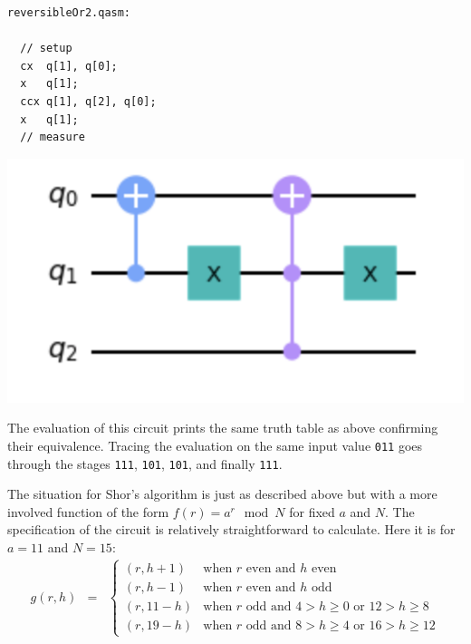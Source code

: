 \begin{center}
  \begin{minipage}[c]{0.4\linewidth}
\begin{verbatim}
reversibleOr2.qasm:

  // setup
  cx  q[1], q[0];
  x   q[1];
  ccx q[1], q[2], q[0];
  x   q[1];
  // measure
  \end{verbatim}
  \end{minipage}
  \qquad
  \includegraphics[scale=0.7]{reversibleOr2.png}
\end{center}

\noindent The evaluation of this circuit prints the same truth table as above confirming their equivalence. Tracing the
evaluation on the same input value \verb|011| goes through the stages \verb|111|, \verb|101|, \verb|101|, and finally \verb|111|.

The situation for Shor's algorithm is just as described above but with a more involved function of the form $f(r) = a^{r} \mod N$ for fixed $a$ and $N$. The specification of the circuit is relatively straightforward to calculate. Here it is for $a=11$ and $N=15$:
\[\begin{array}{rcll}
g(r,h) &=& \left\{ \begin{array}{ll}
                     (r,h+1) & \mbox{when~$r$~even~and~$h$~even} \\
                     (r,h-1) & \mbox{when~$r$~even~and~$h$~odd} \\
                     (r,11-h) & \mbox{when~$r$~odd~and~$4 > h \geq 0$~or~$12 > h \geq 8$} \\
                     (r,19-h) & \mbox{when~$r$~odd~and~$8 > h \geq 4$~or~$16 > h \geq 12$}
                                \end{array}\right.
\end{array}\]

